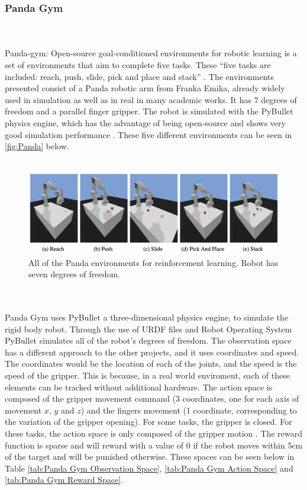 \documentclass[a4paper,12pt]{article}
\begin{document}
\subsubsection{Panda Gym}
\\\\
Panda-gym: Open-source goal-conditioned environments for robotic learning is a set of environments that aim to complete five tasks. These ``five tasks are included: reach, push, slide, pick and place and stack'' \cite{PandaGym}. The environments presented consist of a Panda robotic arm from Franka Emika, already widely used in simulation as well as in real in many academic works. It has 7 degrees of freedom and a parallel finger gripper. The robot is simulated with the PyBullet physics engine, which has the advantage of being open-source and shows very good simulation performance \cite{PandaGym}. These five different environments can be seen in \autoref{fig:Panda} below. 
\\\\
\begin{figure}[H]
\label{fig:Panda}
\centering
\includegraphics[width=15cm]{imgs/Panda.png}
\caption{All of the Panda environments for reinforcement learning. Robot has seven degrees of freedom.}
\label{fig:Panda}
\end{figure}\\\\
\noindent
Panda Gym uses PyBullet a three-dimensional physics engine, to simulate the rigid body robot. Through the use of URDF files and Robot Operating System PyBullet simulates all of the robot's degrees of freedom. The observation space has a different approach to the other projects, and it uses coordinates and speed. The coordinates would be the location of each of the joints, and the speed is the speed of the gripper. This is because, in a real world enviroment, each of these elements can be tracked without additional hardware. The action space is composed of the gripper movement command (3 coordinates, one for each axis of movement $x$, $y$ and $z$) and the fingers movement (1 coordinate, corresponding to the variation of the gripper opening). For some tasks, the gripper is closed. For these tasks, the action space is only composed of the gripper motion \cite{PandaGym}. The reward function is sparse and will reward with a value of 0 if the robot moves within 5cm of the target and will be punished otherwise. These spaces can be seen below in Table \ref{tab:Panda Gym Observation Space}, \ref{tab:Panda Gym Action Space} and \ref{tab:Panda Gym Reward Space}.
\end{document}
